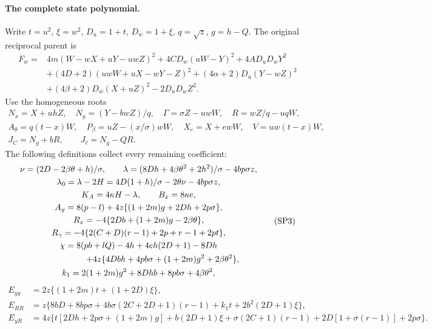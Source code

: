 \documentclass[10pt,a4paper]{article}
\begin{document}
\paragraph{The complete state polynomial.}
Write $t=u^2$, $\xi=w^2$, $D_u=1+t$, $D_w=1+\xi$, $q=\sqrt z$,
$g=h-Q$.  The original reciprocal parent is
\[
\begin{split}
 F_w={}&4m(W-wX+uY-uwZ)^2+4CD_w(uW-Y)^2+4AD_uD_wY^2\\
 &+(4D+2)(uwW+uX-wY-Z)^2+(4\alpha+2)D_u(Y-wZ)^2\\
 &+(4\beta+2)D_w(X+uZ)^2-2D_uD_wZ^2.
\end{split}\tag{P4}\label{eq:c1-reciprocal-parent}
\]
Use the homogeneous roots
\[
\begin{gathered}
 N_x=X+uhZ,\quad N_y=(Y-bwZ)/q,\quad
 \Gamma=\sigma Z-uwW,\quad R=wZ/q-uqW,\\
 A_\theta=q(t-x)W,\quad P_\beta=uZ-(x/\sigma)wW,
 \quad X_e=X+ewW,\quad V=uw(t-x)W,\\
 J_C=N_y+bR,\qquad J_\ell=N_y-QR.
\end{gathered}
\]
The following definitions collect every remaining coefficient:
\[
\begin{gathered}
 \nu=(2D-2\beta\theta+h)/\sigma,\qquad
 \lambda=(8Dh+4\beta\theta^2+2h^2)/\sigma-4bp\sigma z,\\
 \lambda_0=\lambda-2H=4D(1+h)/\sigma-2\theta\nu-4bp\sigma z,\\
 K_A=4\kappa H-\lambda,\qquad B_x=8\kappa e,\\
 A_y=8(p-l)+4z\{(1+2m)g+2Dh+2p\sigma\},\\
 R_x=-4\{2Db+(1+2m)g-2\beta\theta\},\\
 R_\gamma=-4\{2(C+D)(r-1)+2p+r-1+2pt\},\\
 \chi=8(pb+lQ)-4h+4eh(2D+1)-8Dh\\
 \hspace{20mm}+4z\{4Dbh+4pb\sigma+(1+2m)g^2+2\beta\theta^2\},\\
 k_1=2(1+2m)g^2+8Dhb+8pb\sigma+4\beta\theta^2,
\end{gathered}\tag{SP3}\label{eq:c1-contact-coefficients}
\]
\[
\begin{split}
 E_{yy}&=2z\{(1+2m)t+(1+2D)\xi\},\\
 E_{RR}&=z\{8bD+8bp\sigma+4b\sigma(2C+2D+1)(r-1)
                                  +k_1t+2b^2(2D+1)\xi\},\\
 E_{yR}&=4z\{t[2Dh+2p\sigma+(1+2m)g]+b(2D+1)\xi
       +\sigma(2C+1)(r-1)+2D[1+\sigma(r-1)]+2p\sigma\}.
\end{split}
\]
\end{document}
